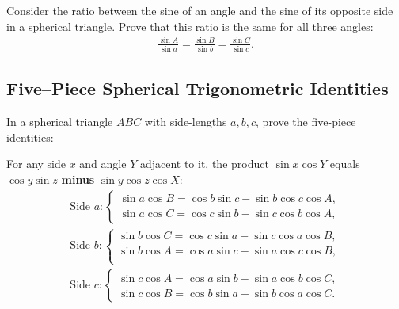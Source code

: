 \documentclass[12pt,a4paper]{memoir}
\theoremstyle{definition}
\begin{document}
\begin{tcolorbox}[title={Spherical Law of Sines}]
	Consider the ratio between the sine of an angle and the sine of its opposite side in a spherical triangle. Prove that this ratio is the same for all three angles:
	\begin{align*}
		\frac{\sin A}{\sin a} = \frac{\sin B}{\sin b} = \frac{\sin C}{\sin c}.
	\end{align*}
\end{tcolorbox}

\subsection{Five--Piece Spherical Trigonometric Identities}


	In a spherical triangle $ABC$ with side-lengths $a,b,c$, prove the five-piece identities:
	\begin{question}[name=Side's Sine Times Adjacent Angle's Cosine]
		For any side $x$ and angle $Y$ adjacent to it, the product $\sin x \cos Y$ equals $\cos y \sin z$ \textbf{minus} $\sin y \cos z \cos X$:
		\begin{align*}
			\text{Side } a: \begin{cases}
				\sin a \cos B = \cos b \sin c - \sin b \cos c \cos A,\\
				\sin a \cos C = \cos c \sin b - \sin c \cos b \cos A,            
			\end{cases}\\
			\text{Side } b: \begin{cases}
				\sin b \cos C = \cos c \sin a - \sin c \cos a \cos B,\\
				\sin b \cos A = \cos a \sin c - \sin a \cos c \cos B,\\
			\end{cases}\\
			\text{Side } c: \begin{cases}
				\sin c \cos A = \cos a \sin b - \sin a \cos b \cos C,\\ 
				\sin c \cos B = \cos b \sin a - \sin b \cos a \cos C.
			\end{cases}
		\end{align*}
	\end{question}
\end{document}
